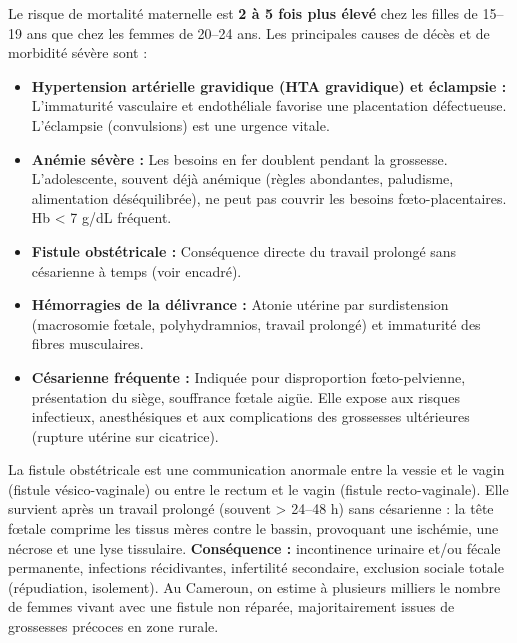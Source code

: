 \documentclass[11pt]{article}
\newcommand{\cle}[1]{{\popxbold\color{popdark}#1}}
\begin{document}
\begin{propriete}
Le risque de \cle{mortalité maternelle} est \textbf{2 à 5 fois plus élevé} chez les filles de 15--19 ans que chez les femmes de 20--24 ans. Les principales causes de décès et de morbidité sévère sont :
\begin{itemize}
    \item \textbf{Hypertension artérielle gravidique (HTA gravidique) et \cle{éclampsie} :} L'immaturité vasculaire et endothéliale favorise une placentation défectueuse. L'éclampsie (convulsions) est une urgence vitale.
    \item \textbf{Anémie sévère :} Les besoins en fer doublent pendant la grossesse. L'adolescente, souvent déjà anémique (règles abondantes, paludisme, alimentation déséquilibrée), ne peut pas couvrir les besoins fœto-placentaires. Hb < 7 g/dL fréquent.
    \item \textbf{Fistule obstétricale :} Conséquence directe du travail prolongé sans césarienne à temps (voir encadré).
    \item \textbf{Hémorragies de la délivrance :} Atonie utérine par surdistension (macrosomie fœtale, polyhydramnios, travail prolongé) et immaturité des fibres musculaires.
    \item \textbf{Césarienne fréquente :} Indiquée pour disproportion fœto-pelvienne, présentation du siège, souffrance fœtale aigüe. Elle expose aux risques infectieux, anesthésiques et aux complications des grossesses ultérieures (rupture utérine sur cicatrice).
\end{itemize}
\end{propriete}

\begin{definition}
La \cle{fistule obstétricale} est une communication anormale entre la \cle{vessie} et le \cle{vagin} (fistule vésico-vaginale) ou entre le \cle{rectum} et le \cle{vagin} (fistule recto-vaginale). Elle survient après un \cle{travail prolongé} (souvent > 24--48 h) sans césarienne : la tête fœtale comprime les tissus mères contre le bassin, provoquant une ischémie, une nécrose et une lyse tissulaire. \textbf{Conséquence :} incontinence urinaire et/ou fécale permanente, infections récidivantes, infertilité secondaire, exclusion sociale totale (répudiation, isolement). Au Cameroun, on estime à plusieurs milliers le nombre de femmes vivant avec une fistule non réparée, majoritairement issues de grossesses précoces en zone rurale.
\end{definition}
\end{document}
